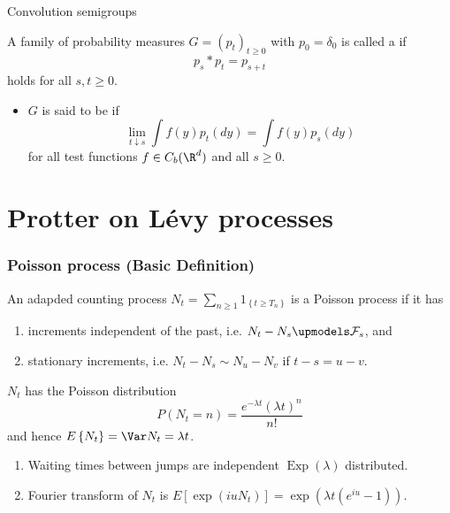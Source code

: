\begin{frame}
    {Convolution semigroups}
    
    A family of probability measures $G=\left( p_t \right)_{t\geq 0}$ with
    $p_0=\delta_0$ is called a  if 
    \begin{equation*}
        p_s * p_t = p_{s+t}
    \end{equation*}
    holds for all $s,t \geq 0$. 

    \begin{itemize}
        \item $G$ is said to be  if
            \begin{equation*}
                \lim_{t\downarrow s} \int f(y) p_t(dy) = \int f(y) p_s(dy)
            \end{equation*}
            for all test functions $f \in C_b(\R^d)$ and all $s \geq 0$. 
    \end{itemize} 
\end{frame}



\section{Protter on L\'evy processes}

\begin{frame}
    \frametitle{Poisson process (Basic Definition)}
   
    An adapded counting process $N_t = \sum_{n\geq 1} 1_{ \left\{ t\geq T_n \right\} }$ 
    is a Poisson process if it has
    \begin{enumerate}
        \item increments independent of the past, i.e. $N_t - N_s \upmodels \mathcal F_s$, and
        \item stationary increments, i.e. $N_t-N_s \sim N_u - N_v$ if $t-s=u-v$.
    \end{enumerate}

    $N_t$ has the Poisson distribution
    \begin{equation}
        P\left(  N_t = n \right) = \frac{e^{-\lambda t }\left( \lambda t  \right)^n }{ n!}
    \end{equation}
    and hence $E \left\{ N_t \right\} = \Var N_t = \lambda t$.
    \begin{enumerate}
        \item Waiting times between jumps are independent 
            $\operatorname{Exp} \left( \lambda \right)$ distributed.
        \item Fourier transform of $N_t$ is 
            $E \left[ \exp\left( iu N_t \right) \right] = 
            \exp\left( \lambda t \left( e^{iu} -1 \right) \right)$.
    \end{enumerate}
\end{frame}

